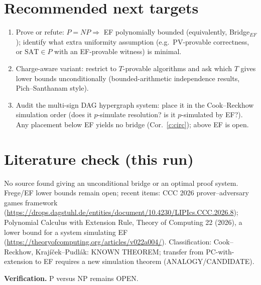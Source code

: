 \documentclass[11pt]{article}
\begin{document}
\section{Recommended next targets}
\begin{enumerate}
\item Prove or refute: $P=NP\Rightarrow$ EF polynomially bounded (equivalently, Bridge$_{EF}$);
 identify what extra uniformity assumption (e.g.\ PV-provable correctness, or $\mathrm{SAT}\in P$ with an
 EF-provable witness) is minimal.
\item Charge-aware variant: restrict to $T$-provable algorithms and ask which $T$ gives
 lower bounds unconditionally (bounded-arithmetic independence results, Pich--Santhanam style).
\item Audit the multi-sign DAG hypergraph system: place it in the Cook--Reckhow simulation order
 (does it $p$-simulate resolution? is it $p$-simulated by EF?). Any placement below EF yields
 no bridge (Cor.~\ref{c:circ}); above EF is open.
\end{enumerate}

\section{Literature check (this run)}
No source found giving an unconditional bridge or an optimal proof system. Frege/EF lower bounds
remain open; recent items: CCC 2026 prover--adversary games framework
(\url{https://drops.dagstuhl.de/entities/document/10.4230/LIPIcs.CCC.2026.8});
Polynomial Calculus with Extension Rule, Theory of Computing 22 (2026), a lower bound for a system
simulating EF (\url{https://theoryofcomputing.org/articles/v022a004/}).
Classification: Cook--Reckhow, Krajíček--Pudlák: KNOWN THEOREM; transfer from PC-with-extension to EF
requires a new simulation theorem (ANALOGY/CANDIDATE).

\medskip\noindent\textbf{Verification.} P versus NP remains OPEN.
\end{document}
